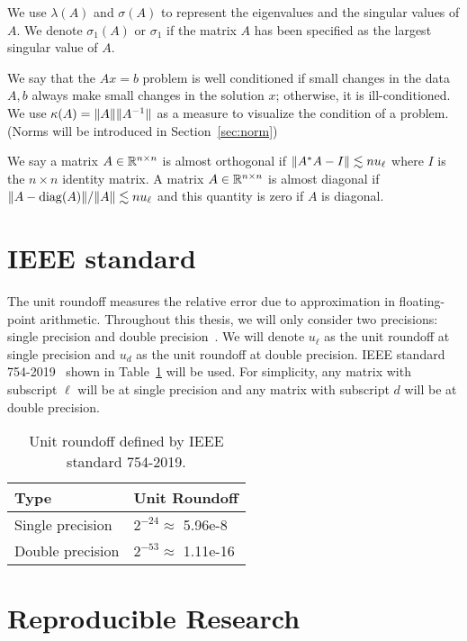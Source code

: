 We use $\lambda(A)$ and $\sigma(A)$ to represent the eigenvalues and the
singular values of $A$. We denote $\sigma_1(A)$ or $\sigma_1$ if the matrix
$A$ has been specified as the largest singular value of $A$.

We say that the $Ax = b$ problem is well conditioned if small changes in
the data $A,b$ always make small changes in the solution $x$; otherwise, it
is ill-conditioned. We use $\kappa(A) = \|{A}\|\|{A^{-1}}\|$ as a
measure to visualize the condition of a problem. (Norms will be introduced
in Section~\ref{sec:norm})

We say a matrix $A\in\mathbb{R}^{n\times n}$ is almost orthogonal if
$\|{A^* A - I}\| \lesssim nu_\ell$ where $I$ is the $n\times n$
identity matrix. A matrix $A\in\mathbb{R}^{n\times n}$ is almost diagonal if
$\|{A - \mathrm{diag}(A)}\|/\|{A}\| \lesssim nu_\ell$ and this quantity is zero
if $A$ is diagonal.


\section{IEEE standard}\label{sec:IEEE}
The unit roundoff measures the relative error due to approximation in
floating-point arithmetic. Throughout this thesis, we will only consider
two precisions: single precision and double precision~. We will denote $u_\ell$ as the unit roundoff at
single precision and $u_d$ as the unit roundoff at double precision. IEEE
standard 754-2019~ shown in
Table~\ref{tab.unit-roundoff} will be used. For simplicity, any matrix with
subscript $\ell$ will be at single precision and any matrix with subscript
$d$ will be at double precision.
\begin{table}[ht]
\centering
\caption{Unit roundoff defined by IEEE standard 754-2019.}
\label{tab.unit-roundoff}
\begin{tabular}{ll}
  \toprule
  Type & Unit Roundoff \\ \midrule 
  Single precision & $2^{-24} \approx $ 5.96e-8 \\
  Double precision & $2^{-53} \approx$ 1.11e-16 \\
  \bottomrule
\end{tabular}
\end{table}


\section{Reproducible Research}

